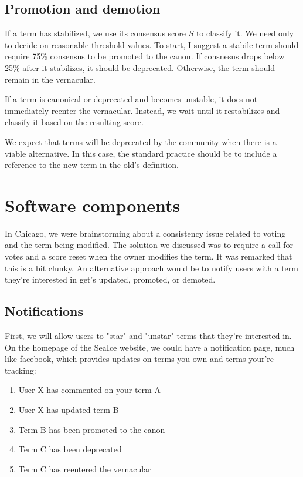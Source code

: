 \documentclass[letter]{article}
\begin{document}
\subsection{Promotion and demotion}
If a term has stabilized, we use its consensus score $S$ to classify it. 
We need only to decide on reasonable threshold values. To start, I suggest a stabile term should 
require 75\% consensus to be promoted to the canon. If consnesus drops below 25\% after it stabilizes, 
it should be deprecated. Otherwise, the term should remain in the vernacular. 

If a term is canonical or deprecated and becomes unstable, it does not immediately reenter the vernacular. 
Instead, we wait until it restabilizes and classify it based on the resulting score. 

We expect that terms will be deprecated by the community when there is a viable alternative. In this case, 
the standard practice should be to include a reference to the new term in the old's definition. 


\section{Software components}
In Chicago, we were brainstorming about a consistency issue related to voting and the term being 
modified. The solution we discussed was to require a call-for-votes and a score reset when the 
owner modifies the term. It was remarked that this is a bit clunky. An alternative approach would be
to notify users with a term they're interested in get's updated, promoted, or demoted. 

\subsection{Notifications}
First, we will allow users to "star" and "unstar" terms that they're interested in. 
On the homepage of the SeaIce website, we could have a notification page, much like facebook, which 
provides updates on terms you own and terms your're tracking:
\begin{enumerate}
  \item User X has commented on your term A
  \item User X has updated term B 
  \item Term B has been promoted to the canon
  \item Term C has been deprecated
  \item Term C has reentered the vernacular
\end{enumerate}
\end{document}
